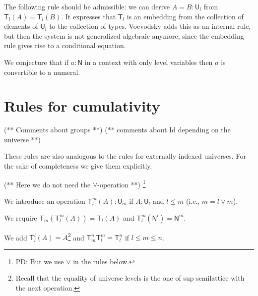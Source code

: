 \documentclass[11pt,a4paper]{article}
\theoremstyle{definition}
\newcommand{\Id}{\mathsf{Id}}
\def\NN{\mathsf{N}}
\def\UU{\mathsf{U}}
\def\Level{\mathsf{Level}}
\newcommand{\T}{\mathsf{T}}
\newcommand{\ua}{\mathsf{ua}}
\newcommand{\UA}{\mathsf{UA}}
\begin{document}
%
%
%
%
%
%
%

The following rule should be admissible:
we can derive $A = B : \UU_l$ from $\T_l(A) = \T_l(B)$.
 It expresses that $\T_l$ is an embedding from the collection of elements of $\UU_l$
 to the collection of types.
 Voevodsky \cite[Rule 20 on p. 17]{VV} adds this as an internal rule, but then the system is not
 generalized algebraic anymore, since the embedding rule gives rise to a conditional equation.

We conjecture that if $a : \NN$ in a context with only level variables
then $a$ is convertible to a numeral.


\section*{Rules for cumulativity}


(** Comments about groups **)
(** comments about Id depending on the universe **)




These rules are also analogous to the rules for externally indexed universes.
For the sake of completeness we give them explicitly.

(** Here we do not need the $\vee$-operation **)
\footnote{PD: But we use $\vee$ in the rules below.}

We introduce an operation $\T_{l}^{m}(A):\UU_{m}$ if $A:\UU_{l}$
and $l\leqslant m$ (i.e., $m = l\vee m$).

We require $\T_{m}(\T_{l}^{m}(A)) = \T_{l}(A)$
and $\T_{l}^{m}(\NN^{l}) = \NN^{m}$.

We add $\T_{l}^l(A) = A$\footnote{Recall that the equality of universe levels is the one of
  sup semilattice with the next operation.}
and $\T_{m}^n\T_{l}^m = \T_l^n$ if $l\leqslant m\leqslant n$.
\end{document}
